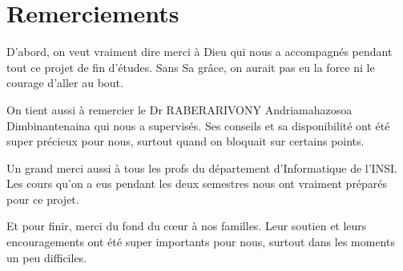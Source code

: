 \chapter*{Remerciements}

D'abord, on veut vraiment dire merci à Dieu qui nous a accompagnés pendant tout ce projet de fin d'études. Sans Sa grâce, on aurait pas eu la force ni le courage d'aller au bout.

On tient aussi à remercier le Dr RABERARIVONY Andriamahazosoa Dimbinantenaina  qui nous a supervisés. Ses conseils et sa disponibilité ont été super précieux pour nous, surtout quand on bloquait sur certains points.

Un grand merci aussi à tous les profs du département d'Informatique de l'INSI. Les cours qu'on a eus pendant les deux semestres nous ont vraiment préparés pour ce projet.

Et pour finir, merci du fond du cœur à nos familles. Leur soutien et leurs encouragements ont été super importants pour nous, surtout dans les moments un peu difficiles.